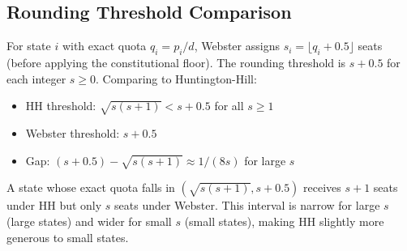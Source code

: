 \subsection{Rounding Threshold Comparison}

For state $i$ with exact quota $q_i = p_i/d$, Webster assigns
$s_i = \lfloor q_i + 0.5 \rfloor$ seats (before applying the constitutional
floor).
The rounding threshold is $s + 0.5$ for each integer $s \geq 0$.
Comparing to Huntington-Hill:
\begin{itemize}
  \item HH threshold: $\sqrt{s(s+1)} < s+0.5$ for all $s \geq 1$
  \item Webster threshold: $s + 0.5$
  \item Gap: $(s+0.5) - \sqrt{s(s+1)} \approx 1/(8s)$ for large $s$
\end{itemize}
A state whose exact quota falls in $({\sqrt{s(s+1)}}, s+0.5)$
receives $s+1$ seats under HH but only $s$ seats under Webster.
This interval is narrow for large $s$ (large states) and wider
for small $s$ (small states), making HH slightly more generous
to small states.
